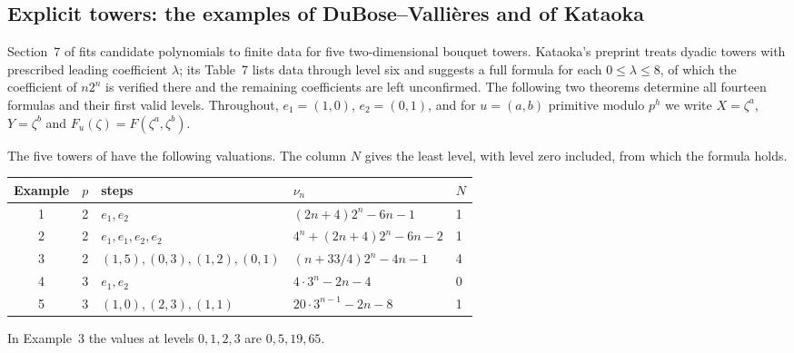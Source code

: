 
\subsection{Explicit towers: the examples of DuBose--Valli\`eres and of Kataoka}\label{gra:sec:explicit}

Section~7 of \cite{DuBoseVallieres2023Towers} fits candidate polynomials to
finite data for five two-dimensional bouquet towers. Kataoka's preprint
\cite[\S6.3, Tables~6--7]{Kataoka2026Iwasawa} treats dyadic towers with
prescribed leading coefficient $\lambda$; its Table~7 lists data through
level six and suggests a full formula for each $0\le\lambda\le8$, of which
the coefficient of $n2^n$ is verified there and the remaining coefficients
are left unconfirmed. The following two theorems determine all fourteen
formulas and their first valid levels. Throughout, $e_1=(1,0)$,
$e_2=(0,1)$, and for $u=(a,b)$ primitive modulo $p^h$ we write
$X=\zeta^a$, $Y=\zeta^b$ and $F_u(\zeta)=F(\zeta^a,\zeta^b)$.

\begin{theorem}\label{gra:thm:five}
The five towers of \cite[\S7]{DuBoseVallieres2023Towers} have the following
valuations. The column $N$ gives the least level, with level zero included,
from which the formula holds.
\begin{center}\small\upshape
\begin{tabular}{cclll}
\toprule
Example & $p$ & steps & $\nu_n$ & $N$\\
\midrule
1 & 2 & $e_1,e_2$ & $(2n+4)2^n-6n-1$ & 1\\
2 & 2 & $e_1,e_1,e_2,e_2$ & $4^n+(2n+4)2^n-6n-2$ & 1\\
3 & 2 & $(1,5),(0,3),(1,2),(0,1)$ & $(n+33/4)2^n-4n-1$ & 4\\
4 & 3 & $e_1,e_2$ & $4\cdot3^n-2n-4$ & 0\\
5 & 3 & $(1,0),(2,3),(1,1)$ & $20\cdot3^{n-1}-2n-8$ & 1\\
\bottomrule
\end{tabular}
\end{center}
In Example~3 the values at levels $0,1,2,3$ are $0,5,19,65$.
\end{theorem}


